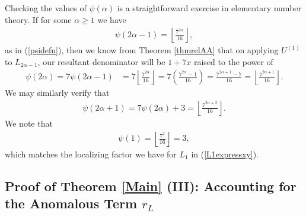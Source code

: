 \documentclass[reqno]{amsart}
\theoremstyle{definition}
\theoremstyle{remark}
\numberwithin{equation}{section}
\begin{document}
Checking the values of $\psi(\alpha)$ is a straightforward exercise in elementary number theory.  If for some $\alpha\ge 1$ we have
\begin{align*}
\psi(2\alpha-1) = \left\lfloor \frac{7^{2\alpha}}{16} \right\rfloor,
\end{align*} as in (\ref{psidefn}), then we know from Theorem \ref{thmrelAA} that on applying $U^{(1)}$ to $L_{2\alpha-1}$, our resultant denominator will be $1+7x$ raised to the power of
\begin{align*}
\psi(2\alpha) = 7\psi(2\alpha-1) &= 7\left\lfloor \frac{7^{2\alpha}}{16} \right\rfloor = 7\left( \frac{7^{2\alpha}-1}{16} \right) = \frac{7^{2\alpha+1}-7}{16} = \left\lfloor \frac{7^{2\alpha+1}}{16} \right\rfloor.
\end{align*}  We may similarly verify that
\begin{align*}
\psi(2\alpha+1) = 7\psi(2\alpha)+3 = \left\lfloor \frac{7^{2\alpha+2}}{16} \right\rfloor.
\end{align*}  We note that
\begin{align*}
\psi(1) = \left\lfloor \frac{7^{2}}{16} \right\rfloor = 3,
\end{align*} which matches the localizing factor we have for $L_1$ in (\ref{L1expressxy}).

\subsection{Proof of Theorem \ref{Main} (III): Accounting for the Anomalous Term $r_L$}
\end{document}
